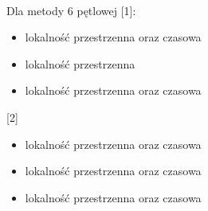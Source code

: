 \documentclass{scrartcl}
\begin{document}
\paragraph{}
Dla metody 6 pętlowej [1]:
\begin{itemize}
\item lokalność przestrzenna oraz czasowa
\item lokalność przestrzenna
\item lokalność przestrzenna oraz czasowa
\end{itemize}
[2]
\begin{itemize}
\item lokalność przestrzenna oraz czasowa
\item lokalność przestrzenna oraz czasowa
\item lokalność przestrzenna oraz czasowa
\end{itemize}
\end{document}
